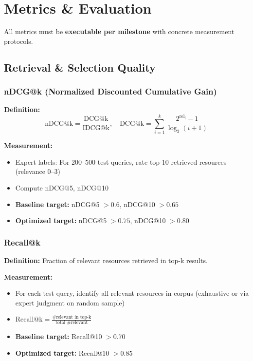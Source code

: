 \documentclass[11pt,letterpaper]{article}
\begin{document}
\newpage

\section{Metrics \& Evaluation}\label{sec:metrics-evaluation}

All metrics must be \textbf{executable per milestone} with concrete measurement protocols.

\subsection{Retrieval \& Selection Quality}\label{subsec:retrieval-selection-quality}

\subsubsection{nDCG@k (Normalized Discounted Cumulative Gain)}\label{subsubsec:ndcg-metric}

\textbf{Definition:}
\[
\text{nDCG@k} = \frac{\text{DCG@k}}{\text{IDCG@k}}, \quad \text{DCG@k} = \sum_{i=1}^{k} \frac{2^{\text{rel}_i} - 1}{\log_2(i+1)}
\]

\textbf{Measurement:}
\begin{itemize}
\item Expert labels: For 200--500 test queries, rate top-10 retrieved resources (relevance 0--3)
\item Compute nDCG@5, nDCG@10
\item \textbf{Baseline target:} nDCG@5 $> 0.6$, nDCG@10 $> 0.65$
\item \textbf{Optimized target:} nDCG@5 $> 0.75$, nDCG@10 $> 0.80$
\end{itemize}

\subsubsection{Recall@k}\label{subsubsec:recall-metric}

\textbf{Definition:} Fraction of relevant resources retrieved in top-k results.

\textbf{Measurement:}
\begin{itemize}
\item For each test query, identify all relevant resources in corpus (exhaustive or via expert judgment on random sample)
\item $\text{Recall@k} = \frac{\text{\# relevant in top-k}}{\text{total \# relevant}}$
\item \textbf{Baseline target:} Recall@10 $> 0.70$
\item \textbf{Optimized target:} Recall@10 $> 0.85$
\end{itemize}
\end{document}
